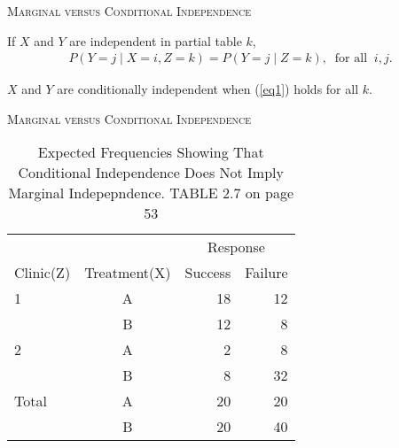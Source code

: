 \documentclass[dvipdfmx, serif,handout]{beamer}
\begin{document}
\begin{frame}{\textsc{Marginal versus Conditional Independence}}

	\bi
	\item If $X$ and $Y$ are independent in partial table $k$,
	\begin{eqnarray}
		P(Y=j \mid X=i, Z=k) = P(Y=j \mid Z=k), \;\; \mbox{for all}\;\; i,j.
		\label{eq1}
	\end{eqnarray}
	\item $X$ and $Y$ are conditionally independent when (\ref{eq1}) holds for all $k$.
	\ei

\end{frame}
\begin{frame}{\textsc{Marginal versus Conditional Independence}}

	{\scriptsize
		\begin{table} %
			\begin{tabular}{lcrr} \hline
				                   &              & \multicolumn{2}{c}{Response}(Y)           \\ \cline{3-4}
				Clinic(Z)          & Treatment(X) & Success                         & Failure \\ \hline
				1                  & A            & 18                              & 12      \\
				                   & B            & 12                              & 8       \\
				2                  & A            & 2                               & 8       \\
				                   & B            & 8                               & 32      \\ \cline{3-4}
				\hspace{.2cm}Total & A            & 20                              & 20      \\
				                   & B            & 20                              & 40      \\ \hline
			\end{tabular}
			\caption{\scriptsize Expected Frequencies Showing That Conditional Independence Does Not Imply Marginal Indepepndence. TABLE 2.7 on page 53}
		\end{table}
	}

\end{frame}
\end{document}
